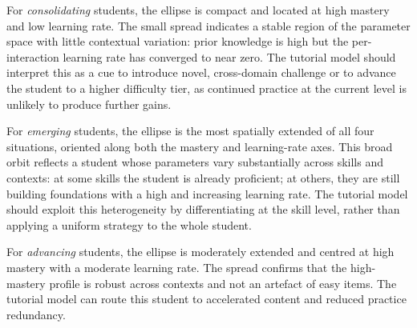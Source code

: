 \documentclass[runningheads]{llncs}
\begin{document}
For \textit{consolidating} students, the ellipse is compact and located at high mastery and low learning rate. The small spread indicates a stable region of the parameter space with little contextual variation: prior knowledge is high but the per-interaction learning rate has converged to near zero. The tutorial model should interpret this as a cue to introduce novel, cross-domain challenge or to advance the student to a higher difficulty tier, as continued practice at the current level is unlikely to produce further gains.

For \textit{emerging} students, the ellipse is the most spatially extended of all four situations, oriented along both the mastery and learning-rate axes. This broad orbit reflects a student whose parameters vary substantially across skills and contexts: at some skills the student is already proficient; at others, they are still building foundations with a high and increasing learning rate. The tutorial model should exploit this heterogeneity by differentiating at the skill level, rather than applying a uniform strategy to the whole student.

For \textit{advancing} students, the ellipse is moderately extended and centred at high mastery with a moderate learning rate. The spread confirms that the high-mastery profile is robust across contexts and not an artefact of easy items. The tutorial model can route this student to accelerated content and reduced practice redundancy.
\end{document}
